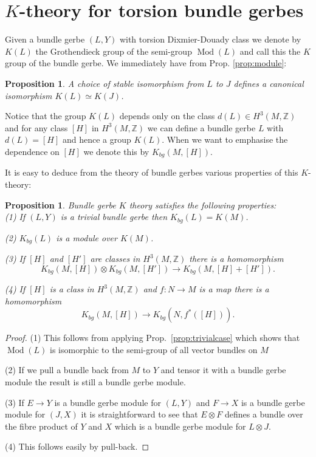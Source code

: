 \documentclass[a4paper,reqno]{amsart}
\DeclareMathOperator{\Mod}{Mod}
\theoremstyle{plain}
\newtheorem{proposition}[theorem]{Proposition}
\theoremstyle{definition}
\theoremstyle{remark}
\numberwithin{equation}{section}
\numberwithin{figure}{section}
\newcommand{\ZZ}{{\mathbb Z}}
\newcommand{\<}{\langle}
\renewcommand{\>}{\rangle}
\begin{document}
\section{$K$-theory for torsion bundle gerbes}

Given a bundle gerbe $(L, Y)$ with torsion Dixmier-Douady class
we denote by
$K(L)$ the Grothendieck group of the
semi-group $\Mod(L)$ and call this the
$K$ group of the bundle gerbe. We  immediately have
from Prop. \ref{prop:module}:

\begin{proposition}
             A choice of stable isomorphism from $L$ to $J$ defines a
             canonical isomorphism $K(L) \simeq K(J)$.
             \end{proposition}


Notice that the group $K(L)$ depends only on the class $d(L) \in H^3(M, \ZZ)$
and for any class $[H]$ in $H^3(M, \ZZ)$ we can define a bundle gerbe $L$ with
$d(L)= [H] $ and hence a group $K(L)$. When we want to emphasise the
dependence on $[H]$ we denote
this by $K_{bg}(M, [H])$.


It is easy to deduce from the theory of bundle gerbes various
      properties of this $K$-theory:

\begin{proposition}
\label{prop:bgkprops}
Bundle gerbe $K$ theory satisfies the following properties:\\

(1) If $(L, Y)$ is a trivial bundle gerbe then $K_{bg}(L) = K(M)$.

(2) $K_{bg}(L)$ is a module over $K(M)$.

(3)  If $[H]$ and $[H']$ are classes in $H^3(M, \ZZ)$ there is a homomorphism
$$
K_{bg}(M, [H]) \otimes K_{bg}(M, [H']) \to K_{bg}(M, [H] + [H']).
$$

(4) If $[H]$ is a class in $H^3(M, \ZZ)$ and $f \colon N \to M$ is a
map  there is a homomorphism
$$
K_{bg}(M, [H]) \to K_{bg}(N, f^*([H])).
$$

\end{proposition}
\begin{proof}
(1)   This follows from applying
Prop.~\ref{prop:trivialcase} which shows that
$\Mod(L)$ is isomorphic to the
semi-group of all vector bundles on $M$

(2) If we pull a bundle back from $M$ to $Y$ and tensor it with a bundle
gerbe module the result is still a bundle gerbe module.

(3) If $E \to Y$ is a bundle gerbe module for $(L, Y)$ and $F \to X$
is a bundle gerbe module for $(J, X)$ it is straightforward to see that
$E \otimes F$ defines a bundle over the fibre product of $Y$ and $X$
which is a bundle gerbe module for $L \otimes J$.

(4) This follows easily by pull-back.

\end{proof}
\end{document}
